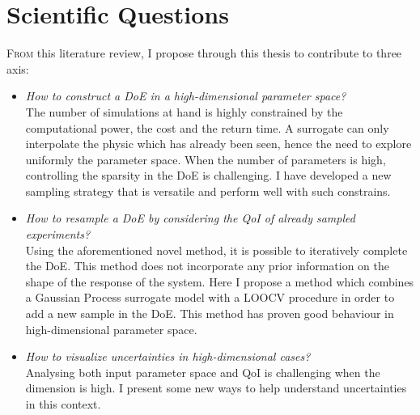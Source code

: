 


\chapter{Scientific Questions}\label{chap:questions}

\lettrine{F}{rom} this literature review, I propose through this thesis to contribute to three axis:

\begin{itemize}
\item \emph{How to construct a DoE in a high-dimensional parameter space?}\hfill\\
	The number of simulations at hand is highly constrained by the computational power, the cost and the return time. A surrogate can only interpolate the physic which has already been seen, hence the need to explore uniformly the parameter space. When the number of parameters is high, controlling the sparsity in the DoE is challenging. I have developed a new sampling strategy that is versatile  and perform well with such constrains.
	
\item \emph{How to resample a DoE by considering the QoI of already sampled experiments?}\hfill\\
	Using the aforementioned novel method, it is possible to iteratively complete the DoE. This method does not incorporate any prior information on the shape of the response of the system. Here I propose a method which combines a Gaussian Process surrogate model with a LOOCV procedure in order to add a new sample in the DoE. This method has proven good behaviour in high-dimensional parameter space.

\item \emph{How to visualize uncertainties in high-dimensional cases?}\hfill\\
    Analysing both input parameter space and QoI is challenging when the dimension is high. I present some new ways to help understand uncertainties in this context.
\end{itemize}







